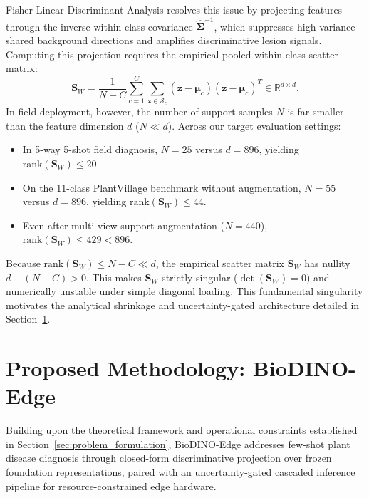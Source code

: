\documentclass[preprint,12pt]{elsarticle}
\begin{document}
Fisher Linear Discriminant Analysis resolves this issue by projecting features through the inverse within-class covariance $\hat{\mathbf{\Sigma}}^{-1}$, which suppresses high-variance shared background directions and amplifies discriminative lesion signals. Computing this projection requires the empirical pooled within-class scatter matrix:
\begin{equation}
    \mathbf{S}_W = \frac{1}{N - C} \sum_{c=1}^C \sum_{\mathbf{z} \in \mathcal{S}_c} (\mathbf{z} - \boldsymbol{\mu}_c)(\mathbf{z} - \boldsymbol{\mu}_c)^T \in \mathbb{R}^{d \times d}.
    \label{eq:empirical_scatter}
\end{equation}
In field deployment, however, the number of support samples $N$ is far smaller than the feature dimension $d$ ($N \ll d$). Across our target evaluation settings:
\begin{itemize}
    \item In 5-way 5-shot field diagnosis, $N = 25$ versus $d = 896$, yielding $\text{rank}(\mathbf{S}_W) \le 20$.
    \item On the 11-class PlantVillage benchmark without augmentation, $N = 55$ versus $d = 896$, yielding $\text{rank}(\mathbf{S}_W) \le 44$.
    \item Even after multi-view support augmentation ($N = 440$), $\text{rank}(\mathbf{S}_W) \le 429 < 896$.
\end{itemize}
Because $\text{rank}(\mathbf{S}_W) \le N - C \ll d$, the empirical scatter matrix $\mathbf{S}_W$ has nullity $d - (N - C) > 0$. This makes $\mathbf{S}_W$ strictly singular ($\det(\mathbf{S}_W) = 0$) and numerically unstable under simple diagonal loading. This fundamental singularity motivates the analytical shrinkage and uncertainty-gated architecture detailed in Section~\ref{sec:methodology}.


\section{Proposed Methodology: BioDINO-Edge}
\label{sec:methodology}
Building upon the theoretical framework and operational constraints established in Section~\ref{sec:problem_formulation}, BioDINO-Edge addresses few-shot plant disease diagnosis through closed-form discriminative projection over frozen foundation representations, paired with an uncertainty-gated cascaded inference pipeline for resource-constrained edge hardware.
\end{document}
